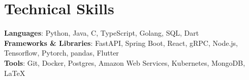 \documentclass[letterpaper,11pt]{article}
\makeatletter
\newcommand{\resumeItem}[1]{
  \item\small{
    {#1 \vspace{-2pt}}
  }
}
\newcommand{\resumeProjectHeading}[2]{
    \item
    \begin{tabular*}{0.97\textwidth}{l@{\extracolsep{\fill}}r}
      \small#1 & #2 \\
    \end{tabular*}\vspace{-7pt}
}
\newcommand{\resumeSubHeadingListEnd}{\end{itemize}}
\newcommand{\resumeItemListStart}{\begin{itemize}}
\newcommand{\resumeItemListEnd}{\end{itemize}\vspace{-5pt}}
\makeatother
\begin{document}
%

\section{Technical Skills}
 \begin{itemize}[leftmargin=0.15in, label={}]
    \small{\item{
     \textbf{Languages}{: Python, Java, C, TypeScript, Golang, SQL, Dart} \\
     \textbf{Frameworks \& Libraries}{: FastAPI, Spring Boot, React, gRPC, Node.js, Tensorflow, Pytorch, pandas, Flutter} \\
     \textbf{Tools}{: Git, Docker, Postgres, Amazon Web Services, Kubernetes, MongoDB, \LaTeX} \\
    }}
 \end{itemize}


\end{document}

